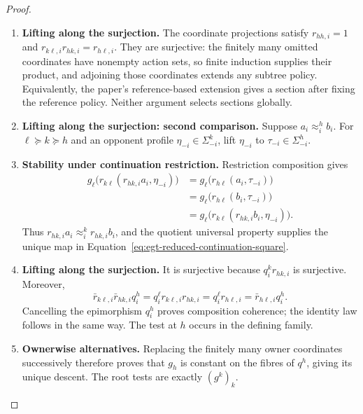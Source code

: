 \documentclass[11pt,a4paper]{article}
\numberwithin{equation}{section}
\theoremstyle{definition}
\theoremstyle{remark}
\theoremstyle{plain}
\begin{document}
\begin{proof}
\leavevmode
\begin{enumerate}[label=\textup{(\arabic*)},leftmargin=*,itemsep=4pt,topsep=3pt]
  \item \textbf{Lifting along the surjection.} The coordinate projections satisfy $r_{hh,i}=1$ and
$r_{k\ell,i}r_{hk,i}=r_{h\ell,i}$. They are surjective: the finitely many
omitted coordinates have nonempty action sets, so finite induction supplies
their product, and adjoining those coordinates extends any subtree policy. Equivalently, the paper's reference-based extension gives a section after
fixing the reference policy. Neither argument selects sections globally.
  \item \textbf{Lifting along the surjection: second comparison.} Suppose $a_i\approx_i^h b_i$. For $\ell\succeq k\succeq h$ and an
opponent profile $\eta_{-i}\in\Sigma_{-i}^k$, lift $\eta_{-i}$ to
$\tau_{-i}\in\Sigma_{-i}^h$.
  \item \textbf{Stability under continuation restriction.} Restriction composition gives
\begin{align*}
 g_\ell\bigl(r_{k\ell}(r_{hk,i}a_i,\eta_{-i})\bigr)
 &=g_\ell\bigl(r_{h\ell}(a_i,\tau_{-i})\bigr)\\
 &=g_\ell\bigl(r_{h\ell}(b_i,\tau_{-i})\bigr)\\
 &=g_\ell\bigl(r_{k\ell}(r_{hk,i}b_i,\eta_{-i})\bigr).
\end{align*}
Thus $r_{hk,i}a_i\approx_i^k r_{hk,i}b_i$, and the quotient universal
property supplies the unique map in
Equation~\eqref{eq:egt-reduced-continuation-square}.
  \item \textbf{Lifting along the surjection.} It is surjective because
$q_i^k r_{hk,i}$ is surjective. Moreover,
\[
 \bar r_{k\ell,i}\bar r_{hk,i}q_i^h
 =q_i^\ell r_{k\ell,i}r_{hk,i}
 =q_i^\ell r_{h\ell,i}
 =\bar r_{h\ell,i}q_i^h.
\]
Cancelling the epimorphism $q_i^h$ proves composition coherence; the identity
law follows in the same way. The test at $h$ occurs in the defining family.
  \item \textbf{Ownerwise alternatives.} Replacing the finitely many owner coordinates successively therefore proves
that $g_h$ is constant on the fibres of $q^h$, giving its unique descent. The root tests are exactly $(g^k)_k$.
\end{enumerate}
\end{proof}
\end{document}
